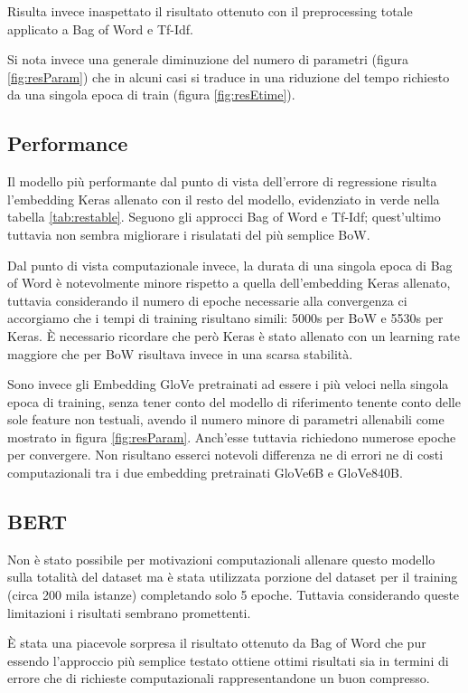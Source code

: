 Risulta invece inaspettato il risultato ottenuto con il preprocessing totale
applicato a Bag of Word e Tf-Idf.

Si nota invece una generale diminuzione del numero di parametri (figura
\ref{fig:resParam}) che in alcuni casi si traduce in una riduzione del tempo
richiesto da una singola epoca di train (figura \ref{fig:resEtime}).


\subsection{Performance}
Il modello più performante dal punto di vista dell'errore di regressione risulta
l'embedding Keras allenato con il resto del modello, evidenziato in verde nella
tabella \ref{tab:restable}. Seguono gli approcci Bag of Word e Tf-Idf;
quest'ultimo tuttavia non sembra migliorare i risulatati del più semplice BoW.

Dal punto di vista computazionale invece, la durata di una singola epoca di Bag
of Word è notevolmente minore rispetto a quella dell'embedding Keras allenato,
tuttavia considerando il numero di epoche necessarie alla convergenza ci
accorgiamo che i tempi di training risultano simili: 5000s per BoW e 5530s per
Keras. È necessario ricordare che però Keras è stato allenato con un learning
rate maggiore che per BoW risultava invece in una scarsa stabilità.

Sono invece gli Embedding GloVe pretrainati ad essere i più veloci nella singola
epoca di training, senza tener conto del modello di riferimento tenente conto
delle sole feature non testuali, avendo il numero minore di
parametri allenabili come mostrato in figura \ref{fig:resParam}. Anch'esse
tuttavia richiedono numerose epoche per convergere. Non risultano esserci
notevoli differenza ne di errori ne di costi computazionali tra i due embedding
pretrainati GloVe6B e GloVe840B.

\subsection{BERT}

Non è stato possibile per motivazioni computazionali allenare questo
modello sulla totalità del dataset ma è stata utilizzata porzione del
dataset per il training (circa 200 mila istanze) completando solo 5 epoche.
Tuttavia considerando queste limitazioni i risultati sembrano promettenti.

È stata una piacevole sorpresa il risultato ottenuto da Bag of Word che pur
essendo l'approccio più semplice testato ottiene ottimi risultati sia in termini
di errore che di richieste computazionali rappresentandone un buon compresso.